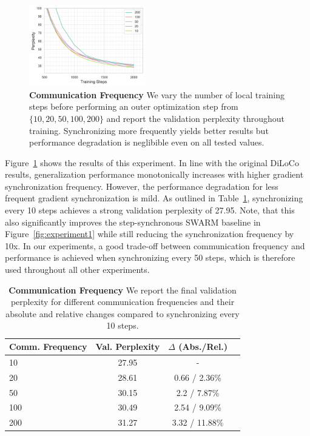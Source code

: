 \documentclass[conference, 10pt]{IEEEtran}
\begin{document}
\begin{figure}[ht]
  \centering
  \includegraphics[width=0.45\textwidth]{figures/experiment3.png}
  \caption{\textbf{Communication Frequency} We vary the number of local training
  steps before performing an outer optimization step from $\{10, 20, 50, 100, 200\}$ 
  and report the validation perplexity throughout training. Synchronizing more
  frequently yields better results but performance degradation is neglibible even
  on all tested values.}
  \label{fig:experiment2}
\end{figure}

Figure~\ref{fig:experiment2} shows the results of this experiment. In line with
the original DiLoCo results, generalization performance monotonically increases
with higher gradient synchronization frequency. However, the performance
degradation for less frequent gradient synchronization is mild. As outlined in
Table~\ref{tab:experiment2}, synchronizing every 10 steps achieves a strong
validation perplexity of 27.95. Note, that this also significantly improves the
step-synchronous SWARM baseline in Figure~\ref{fig:experiment1} while still
reducing the synchronization frequency by 10x. In our experiments, a good
trade-off between communication frequency and performance is achieved when
synchronizing every 50 steps, which is therefore used throughout all other
experiments.

\begin{table}[ht]
\centering
\begin{tabular}{lccc}
\toprule
\textbf{Comm. Frequency} & \textbf{Val. Perplexity} & \textbf{$\Delta$ (Abs./Rel.)} \\ 
\midrule
10 & 27.95 & - \\
20 & 28.61 & 0.66 / 2.36\% \\
50 & 30.15 & 2.2 / 7.87\% \\
100 & 30.49 & 2.54 / 9.09\% \\
200 & 31.27 & 3.32 / 11.88\% \\
\bottomrule
\end{tabular}
\caption{\textbf{Communication Frequency} We report the final validation
perplexity for different communication frequencies and their absolute and
relative changes compared to synchronizing every 10 steps.}
\label{tab:experiment2}
\end{table}
\end{document}
